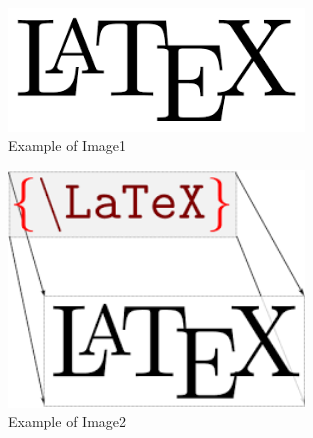 \documentclass{article}
\begin{document}
    \begin{figure}
        \centering
        \includegraphics[width=0.7\textwidth]{"imageLatex1"}
        \caption{Example of Image1}
    \end{figure}

    \begin{figure}
		\centering
		\includegraphics[width=0.7\textwidth]{"imageLatex2"}
		\caption{Example of Image2}
	\end{figure}
\end{document}
